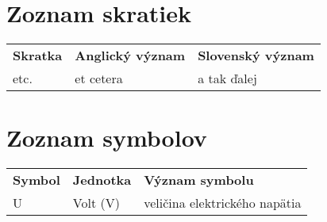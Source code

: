\newpage %
\thispagestyle{empty}
\section*{Zoznam skratiek}

\begin{tabularx}{\textwidth}{ 
		>{\raggedright\arraybackslash}X 
		>{\raggedright\arraybackslash}X
		>{\raggedright\arraybackslash}X }
	\textbf{Skratka} & \textbf{Anglický význam} & \textbf{Slovenský význam} \\
	etc. & et cetera & a tak ďalej
\end{tabularx}

\section*{Zoznam symbolov}

\begin{tabularx}{\textwidth}{ 
		>{\raggedright\arraybackslash}X 
		>{\raggedright\arraybackslash}X
		>{\raggedright\arraybackslash}X }
	\textbf{Symbol} & \textbf{Jednotka} & \textbf{Význam symbolu} \\
	U & Volt (V) & veličina elektrického napätia
\end{tabularx}